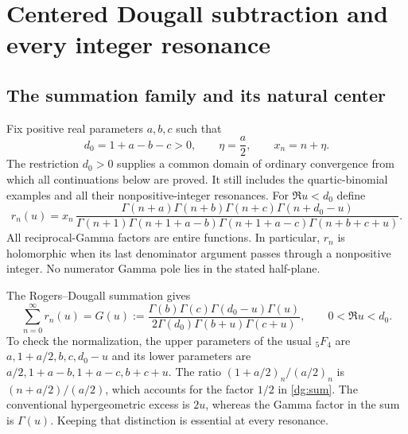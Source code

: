 \section{Centered Dougall subtraction and every integer resonance}
\label{dg:section}

\subsection{The summation family and its natural center}
Fix positive real parameters $a,b,c$ such that
\begin{equation}\label{dg:domain}
 d_0=1+a-b-c>0,\qquad \eta=\frac a2,\qquad x_n=n+\eta.
\end{equation}
The restriction $d_0>0$ supplies a common domain of ordinary convergence
from which all continuations below are proved. It still includes the
quartic-binomial examples and all their nonpositive-integer resonances.
For $\Re u<d_0$ define
\begin{equation}\label{dg:rn}
 r_n(u)=x_n\,
 \frac{\Gamma(n+a)\Gamma(n+b)\Gamma(n+c)\Gamma(n+d_0-u)}
 {\Gamma(n+1)\Gamma(n+1+a-b)\Gamma(n+1+a-c)
  \Gamma(n+b+c+u)}.
\end{equation}
All reciprocal-Gamma factors are entire functions. In particular,
$r_n$ is holomorphic when its last denominator argument passes through
a nonpositive integer. No numerator Gamma pole lies in the stated
half-plane.

The Rogers--Dougall summation \cite[Eq.~16.4.9]{dlmf-hyper} gives
\begin{equation}\label{dg:sum}
 \sum_{n=0}^{\infty}r_n(u)=G(u):=
 \frac{\Gamma(b)\Gamma(c)\Gamma(d_0-u)\Gamma(u)}
 {2\Gamma(d_0)\Gamma(b+u)\Gamma(c+u)},
 \qquad 0<\Re u<d_0.
\end{equation}
To check the normalization, the upper parameters of the usual
${}_5F_4$ are $a,1+a/2,b,c,d_0-u$ and its lower parameters are
$a/2,1+a-b,1+a-c,b+c+u$. The ratio
$(1+a/2)_n/(a/2)_n$ is $(n+a/2)/(a/2)$, which accounts for the
factor $1/2$ in \eqref{dg:sum}. The conventional hypergeometric excess
is $2u$, whereas the Gamma factor in the sum is $\Gamma(u)$.
Keeping that distinction is essential at every resonance.

